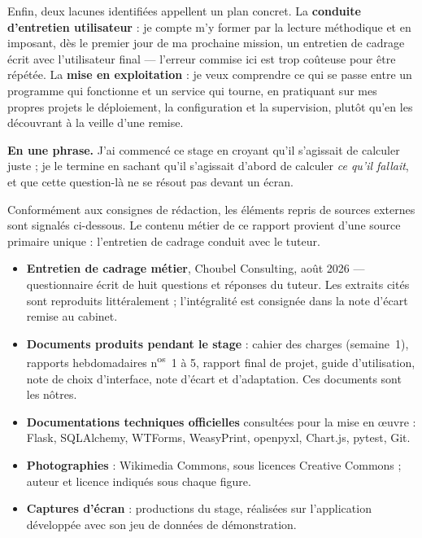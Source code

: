 \documentclass[12pt,a4paper]{article}
\newcommand{\entreprise}{Choubel Consulting}
\begin{document}
Enfin, deux lacunes identifiées appellent un plan concret. La \textbf{conduite
	d'entretien utilisateur} : je compte m'y former par la lecture méthodique et
en imposant, dès le premier jour de ma prochaine mission, un entretien de
cadrage écrit avec l'utilisateur final --- l'erreur commise ici est trop coûteuse
pour être répétée. La \textbf{mise en exploitation} : je veux comprendre ce qui
se passe entre un programme qui fonctionne et un service qui tourne, en
pratiquant sur mes propres projets le déploiement, la configuration et la
supervision, plutôt qu'en les découvrant à la veille d'une remise.

\begin{encadrecle}
	\textbf{En une phrase.} J'ai commencé ce stage en croyant qu'il s'agissait de
	calculer juste ; je le termine en sachant qu'il s'agissait d'abord de calculer
	\emph{ce qu'il fallait}, et que cette question-là ne se résout pas devant un
	écran.
\end{encadrecle}


Conformément aux consignes de rédaction, les éléments repris de sources externes
sont signalés ci-dessous. Le contenu métier de ce rapport provient d'une source
primaire unique : l'entretien de cadrage conduit avec le tuteur.

\begin{itemize}
	\item \textbf{Entretien de cadrage métier}, \entreprise, août 2026 ---
	questionnaire écrit de huit questions et réponses du tuteur. Les extraits
	cités sont reproduits littéralement ; l'intégralité est consignée dans la
	note d'écart remise au cabinet.
	\item \textbf{Documents produits pendant le stage} : cahier des charges
	(semaine~1), rapports hebdomadaires n\textsuperscript{os}~1 à 5, rapport final
	de projet, guide d'utilisation, note de choix d'interface, note d'écart et
	d'adaptation. Ces documents sont les nôtres.
	\item \textbf{Documentations techniques officielles} consultées pour la mise
	en œuvre : Flask, SQLAlchemy, WTForms, WeasyPrint, openpyxl, Chart.js,
	pytest, Git.
	\item \textbf{Photographies} : Wikimedia Commons, sous licences Creative
	Commons ; auteur et licence indiqués sous chaque figure.
	\item \textbf{Captures d'écran} : productions du stage, réalisées sur
	l'application développée avec son jeu de données de démonstration.
\end{itemize}
\end{document}
